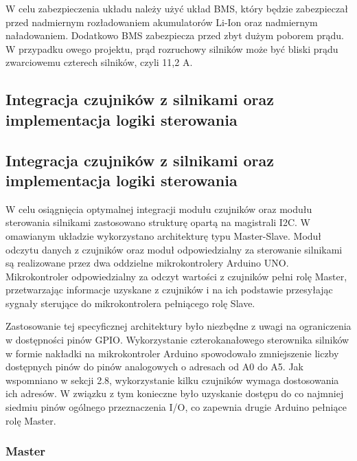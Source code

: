 \documentclass{report}
\begin{document}
W celu zabezpieczenia układu należy użyć układ BMS, który będzie zabezpieczał przed nadmiernym rozładowaniem akumulatorów Li-Ion oraz nadmiernym naładowaniem. Dodatkowo BMS zabezpiecza przed zbyt dużym poborem prądu. W przypadku owego projektu, prąd rozruchowy silników może być bliski prądu zwarciowemu czterech silników, czyli 11,2 A.

\newpage
\subsection{\Large Integracja czujników z silnikami oraz implementacja logiki sterowania}


\newpage
\subsection{\Large Integracja czujników z silnikami oraz implementacja logiki sterowania}
%
%

W celu osiągnięcia optymalnej integracji modułu czujników oraz modułu sterowania silnikami zastosowano strukturę opartą na magistrali I2C. W omawianym układzie wykorzystano architekturę typu Master-Slave. Moduł odczytu danych z czujników oraz moduł odpowiedzialny za sterowanie silnikami są realizowane przez dwa oddzielne mikrokontrolery Arduino UNO. Mikrokontroler odpowiedzialny za odczyt wartości z czujników pełni rolę Master, przetwarzając informacje uzyskane z czujników i na ich podstawie przesyłając sygnały sterujące do mikrokontrolera pełniącego rolę Slave.

Zastosowanie tej specyficznej architektury było niezbędne z uwagi na ograniczenia w dostępności pinów GPIO. Wykorzystanie czterokanałowego sterownika silników w formie nakładki na mikrokontroler Arduino spowodowało zmniejszenie liczby dostępnych pinów do pinów analogowych o adresach od A0 do A5. Jak wspomniano w sekcji 2.8, wykorzystanie kilku czujników wymaga dostosowania ich adresów. W związku z tym konieczne było uzyskanie dostępu do co najmniej siedmiu pinów ogólnego przeznaczenia I/O, co zapewnia drugie Arduino pełniące rolę Master.

\subsubsection{\large Master}
\end{document}
